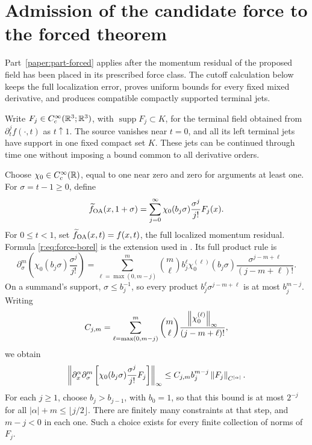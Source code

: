 \section{Admission of the candidate force to the forced theorem}
\label{r:sec:force-extension}

Part~\ref{paper:part-forced} applies after the momentum residual of the proposed field has been
placed in its prescribed force class. The cutoff calculation below keeps the
full localization error, proves uniform bounds for every fixed mixed
derivative, and produces compatible compactly supported terminal jets.



Write \(F_j\in C_c^\infty(\mathbb R^3;\mathbb R^3)\), with
\(\operatorname{supp}F_j\subset K\), for the terminal field obtained from
\(\partial_t^j f(\cdot,t)\) as \(t\uparrow1\). The source vanishes near
\(t=0\), and all its left terminal jets have support in one fixed compact
set \(K\). These jets can be continued through time one without imposing a
bound common to all derivative orders.

Choose \(\chi_0\in C_c^\infty(\mathbb R)\), equal to one near zero and zero for
arguments at least one. For \(\sigma=t-1\ge0\), define
\begin{equation}
 \widetilde f_{\rm OA}(x,1+\sigma)=\sum_{j=0}^\infty
 \chi_0(b_j\sigma)\frac{\sigma^j}{j!}F_j(x).
 \label{r:eq:force-borel}
\end{equation}
For \(0\le t<1\), set \(\widetilde f_{\rm OA}(x,t)=f(x,t)\), the full
localized momentum residual. Formula \eqref{r:eq:force-borel} is the
extension used in \cite[(10.11)]{openai-paper}. Its full product rule is
\[
 \partial_\sigma^m
 \left(\chi_0(b_j\sigma)\frac{\sigma^j}{j!}\right)
 =\sum_{\ell=\max(0,m-j)}^m
 \binom m\ell b_j^\ell\chi_0^{(\ell)}(b_j\sigma)
 \frac{\sigma^{j-m+\ell}}{(j-m+\ell)!}.
\]
On a summand's support, \(\sigma\le b_j^{-1}\), so every product
\(b_j^\ell\sigma^{j-m+\ell}\) is at most \(b_j^{m-j}\). Writing
\[
 C_{j,m}=\sum_{\ell=\max(0,m-j)}^m
 \binom m\ell\frac{\left\lVert \chi_0^{(\ell)}\right\rVert_\infty}{(j-m+\ell)!},
\]
we obtain
\begin{equation}
 \left\|\partial_x^\alpha\partial_\sigma^m
 \left[\chi_0(b_j\sigma)\frac{\sigma^j}{j!}F_j\right]\right\|_\infty
 \le C_{j,m}b_j^{m-j}\left\lVert F_j\right\rVert_{C^{|\alpha|}}.
 \label{r:eq:force-borel-bound}
\end{equation}
For each \(j\ge1\), choose \(b_j>b_{j-1}\), with \(b_0=1\), so that
this bound is at most \(2^{-j}\) for all
\(|\alpha|+m\le\lfloor j/2\rfloor\). There are finitely many constraints at
that step, and \(m-j<0\) in each one. Such a choice exists for every finite
collection of norms of \(F_j\).

